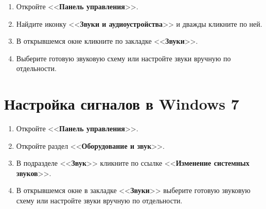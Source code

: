 \documentclass[12pt, a4paper, twocolumn]{report}
\newcommand{\CTL}[1]{<<{\bf #1}>>}
\begin{document}
\begin{enumerate}

\item Откройте \CTL{Панель управления}.

\item Найдите иконку \CTL{Звуки и аудиоустройства} и дважды кликните по ней.

\item В открывшемся окне кликните по закладке \CTL{Звуки}.

\item Выберите готовую звуковую схему или настройте звуки вручную по отдельности.

\end{enumerate}

\section*{Настройка сигналов в Windows 7}

\begin{enumerate}

\item Откройте \CTL{Панель управления}.

\item Откройте раздел \CTL{Оборудование и звук}.

\item В подразделе \CTL{Звук} кликните по ссылке \CTL{Изменение системных звуков}.

\item В открывшемся окне в закладке \CTL{Звуки} выберите готовую звуковую схему или настройте звуки вручную по отдельности.

\end{enumerate}
\end{document}
